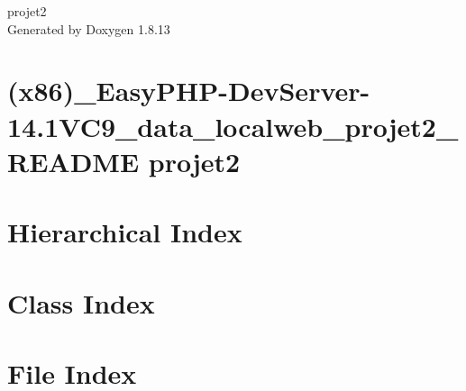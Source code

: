 \documentclass[twoside]{book}
\newcommand{\+}{\discretionary{\mbox{\scriptsize$\hookleftarrow$}}{}{}}
\newcommand{\clearemptydoublepage}{%
  \newpage{\pagestyle{empty}\cleardoublepage}%
}
\begin{document}
\hypersetup{pageanchor=false,
             bookmarksnumbered=true,
             pdfencoding=unicode
            }
\begin{titlepage}
\vspace*{7cm}
\begin{center}%
{\Large projet2 }\\
\vspace*{1cm}
{\large Generated by Doxygen 1.8.13}\\
\end{center}
\end{titlepage}
\clearemptydoublepage
{}
\tableofcontents
\clearemptydoublepage
{}
\hypersetup{pageanchor=true}

\chapter{(x86)\+\_\+\+Easy\+P\+H\+P-\/\+Dev\+Server-\/14.1\+V\+C9\+\_\+data\+\_\+localweb\+\_\+projet2\+\_\+\+R\+E\+A\+D\+ME projet2}
\label{md__c_1__program__files_}

\chapter{Hierarchical Index}

\chapter{Class Index}

\chapter{File Index}

\end{document}
